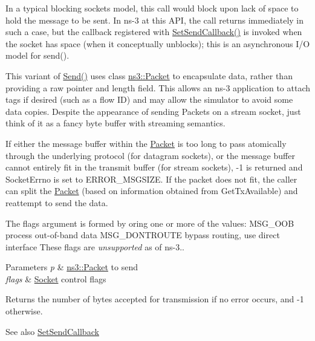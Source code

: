 In a typical blocking sockets model, this call would block upon lack of space to hold the message to be sent. In ns-\/3 at this A\+PI, the call returns immediately in such a case, but the callback registered with \hyperlink{classns3_1_1Socket_a85ff5c8cc7d242823f301b49264c68a4}{Set\+Send\+Callback()} is invoked when the socket has space (when it conceptually unblocks); this is an asynchronous I/O model for send().

This variant of \hyperlink{classns3_1_1TcpSocketBase_a172e373bab86078af4462fc1415c59e4}{Send()} uses class \hyperlink{classns3_1_1Packet}{ns3\+::\+Packet} to encapsulate data, rather than providing a raw pointer and length field. This allows an ns-\/3 application to attach tags if desired (such as a flow ID) and may allow the simulator to avoid some data copies. Despite the appearance of sending Packets on a stream socket, just think of it as a fancy byte buffer with streaming semantics.

If either the message buffer within the \hyperlink{classns3_1_1Packet}{Packet} is too long to pass atomically through the underlying protocol (for datagram sockets), or the message buffer cannot entirely fit in the transmit buffer (for stream sockets), -\/1 is returned and Socket\+Errno is set to E\+R\+R\+O\+R\+\_\+\+M\+S\+G\+S\+I\+ZE. If the packet does not fit, the caller can split the \hyperlink{classns3_1_1Packet}{Packet} (based on information obtained from Get\+Tx\+Available) and reattempt to send the data.

The flags argument is formed by or\textquotesingle{}ing one or more of the values\+: M\+S\+G\+\_\+\+O\+OB process out-\/of-\/band data M\+S\+G\+\_\+\+D\+O\+N\+T\+R\+O\+U\+TE bypass routing, use direct interface These flags are {\itshape unsupported} as of ns-\/3..


\begin{DoxyParams}{Parameters}
{\em p} & \hyperlink{classns3_1_1Packet}{ns3\+::\+Packet} to send \\
\hline
{\em flags} & \hyperlink{classns3_1_1Socket}{Socket} control flags \\
\hline
\end{DoxyParams}
\begin{DoxyReturn}{Returns}
the number of bytes accepted for transmission if no error occurs, and -\/1 otherwise.
\end{DoxyReturn}
\begin{DoxySeeAlso}{See also}
\hyperlink{classns3_1_1Socket_a85ff5c8cc7d242823f301b49264c68a4}{Set\+Send\+Callback} 
\end{DoxySeeAlso}


